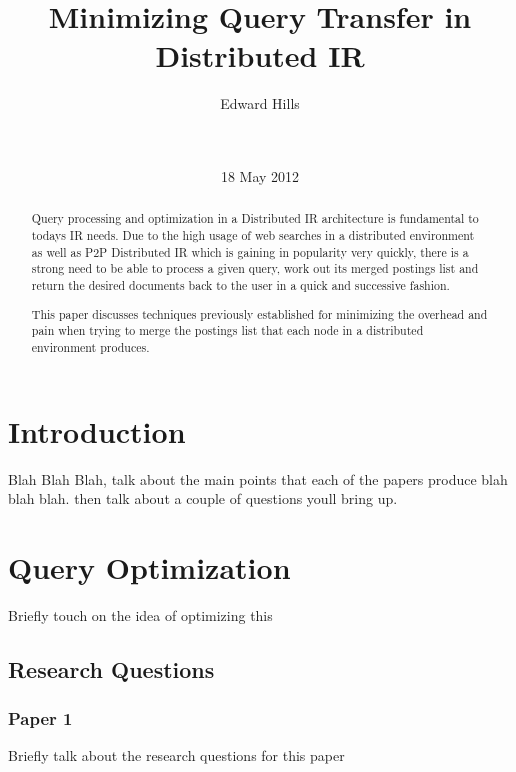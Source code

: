 \documentclass{acm_proc_article-sp}
\begin{document}
\title{Minimizing Query Transfer in Distributed IR}

\author{
\alignauthor
Edward Hills\\\\
       \\
       }
\date{18 May 2012}

\maketitle
\begin{abstract}
Query processing and optimization in a Distributed IR architecture is fundamental to todays IR needs. Due to the high usage of web searches in a distributed environment as well as P2P Distributed IR which is gaining in popularity very quickly, there is a strong need to be able to process a given query, work out its merged postings list and return the desired documents back to the user in a quick and successive fashion.

This paper discusses techniques previously established for minimizing the overhead and pain when trying to merge the postings list that each node in a distributed environment produces.
\end{abstract}

\section{Introduction}

Blah Blah Blah, talk about the main points that each of the papers produce blah blah blah. then talk about a couple of questions youll bring up.

\section{Query Optimization}

Briefly touch on the idea of optimizing this

\subsection{Research Questions}
\subsubsection{Paper 1}
Briefly talk about the research questions for this paper
\end{document}
